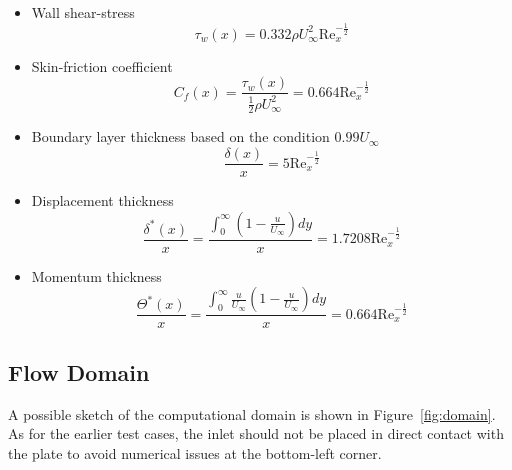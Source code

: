 \documentclass[12pt]{article}
\begin{document}
                \begin{itemize}
                        \item Wall shear-stress
                                \begin{equation*}
                                        \tau_w(x) = 0.332 \rho U_\infty^2 \text{Re}_x^{-\frac{1}{2}}
                                \end{equation*}
                        \item Skin-friction coefficient
                                \begin{equation*}
                                        C_f(x) = \frac{\tau_w(x)}{\frac{1}{2} \rho U_\infty^2} = 0.664 \text{Re}_x^{-\frac{1}{2}}
                                \end{equation*}
                        \item Boundary layer thickness based on the condition $ 0.99 U_\infty $
                                \begin{equation*}
                                        \frac{\delta(x)}{x} = 5 \text{Re}_x^{-\frac{1}{2}}
                                \end{equation*}
                        \item Displacement thickness
                                \begin{equation*}
                                        \frac{\delta^*(x)}{x} = \frac{\int_0^\infty \left( 1 - \frac{u}{U_\infty} \right) dy}{x} = 1.7208 \text{Re}_x^{-\frac{1}{2}}
                                \end{equation*}
                        \item Momentum thickness
                                \begin{equation*}
                                        \frac{\Theta^*(x)}{x} = \frac{\int_0^\infty \frac{u}{U_\infty} \left( 1 - \frac{u}{U_\infty} \right) dy}{x} = 0.664 \text{Re}_x^{-\frac{1}{2}}
                                \end{equation*}
                \end{itemize}

        \subsection{Flow Domain}

                A possible sketch of the computational domain is shown in Figure~\ref{fig:domain}. As for the earlier test cases, the inlet should not be placed in direct contact with the plate to avoid numerical issues at the bottom-left corner.
\end{document}
